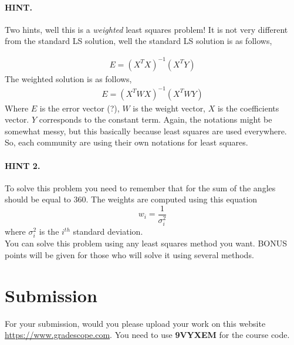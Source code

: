 \documentclass[]{scrartcl}
\begin{document}
\paragraph{HINT.}Two hints, well this is a \textit{weighted} least squares problem! It is not very different from the standard LS solution, well the standard LS solution is as follows,

\begin{eqnarray}
E = (X^TX)^{-1}(X^TY)
\end{eqnarray}
The weighted solution is as follows,
\begin{eqnarray}
E = (X^TWX)^{-1}(X^TWY)
\end{eqnarray}
Where $E$ is the error vector (?), $W$ is the weight vector, $X$ is the coefficients vector. $Y$ corresponds to the constant term.
Again, the notations might be somewhat messy, but this basically because least squares are used everywhere. So, each community are using their own notations for least squares.
\paragraph{HINT 2.}To solve this problem you need to remember that for the sum of the angles should be equal to 360. The weights are computed using this equation
\begin{equation}
	w_i = \frac{1}{\sigma^2_i}
\end{equation}
where $\sigma^2_i$ is the $i^{th}$ standard deviation.
\\
You can solve this problem using any least squares method you want. BONUS points will be given for those who will solve it using several methods.

\section{Submission}
For your submission, would you please upload your work on this website \href{https://www.gradescope.com}{https://www.gradescope.com}. You need to use \textbf{9VYXEM} for the course code.
\end{document}
